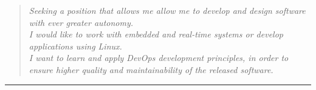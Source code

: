 \documentclass[english,10pt,a4paper]{article}
\begin{document}
\begin{paracol}{2}
	\begin{tcolorbox}[colback=CvSidebarBackColor,height=\textheight,boxrule=0pt, left=0pt,right=0pt,top=0pt,bottom=0pt, arc=0pt,outer arc=0pt]
		\centering
		
		\begin{quotation}
			\textcolor{CvSidebarTextColor}
			{\textsl{Seeking a position that allows me allow me to develop and design  software with ever greater autonomy.\\	
			I would like to work with embedded and real-time systems or develop applications using Linux.\\
			I want to learn and apply DevOps development principles, in
			order to ensure higher quality and maintainability of the
			released software.
			}}
			
		\end{quotation}

		\textcolor{CvSidebarTextColor}{\rule[.5\baselineskip]{0.9\textwidth}{1.5pt}}


\end{tcolorbox}
\end{paracol}
\end{document}
